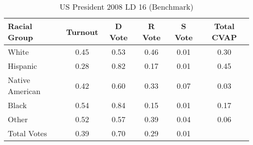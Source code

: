 \begin{table}[htb]
\begin{center}
\caption{US President 2008 LD 16 (Benchmark)}
\label{pres08_cvap_ld_16_benchmark}
\begin{tabular}{lccccc}
  \hline
Racial Group & Turnout & D Vote & R Vote & S Vote & Total CVAP \\ 
  \hline
White & 0.45 & 0.53 & 0.46 & 0.01 & 0.30 \\ 
  Hispanic & 0.28 & 0.82 & 0.17 & 0.01 & 0.45 \\ 
  Native American & 0.42 & 0.60 & 0.33 & 0.07 & 0.03 \\ 
  Black & 0.54 & 0.84 & 0.15 & 0.01 & 0.17 \\ 
  Other & 0.52 & 0.57 & 0.39 & 0.04 & 0.06 \\ 
  Total Votes & 0.39 & 0.70 & 0.29 & 0.01 &  \\ 
   \hline
\end{tabular}
\end{center}
\end{table}
